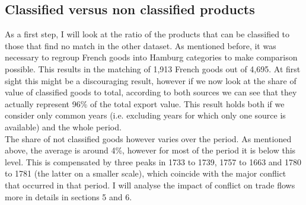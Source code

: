 \documentclass[12pt,a4paper,titlepage,english]{article}
\begin{document}
\subsection{Classified versus non classified products}
As a first step, I will look at the ratio of the products that can be classified to those that find no match in the other dataset. As mentioned before, it was necessary to regroup French goods into Hamburg categories to make comparison possible. This results in the matching of 1,913 French goods out of 4,695. At first sight this might be a discouraging result, however if we now look at the share of value of classified goods to total, according to both sources we can see that they actually represent 96\% of the total export value. This result holds both if we consider only common years (i.e. excluding years for which only one source is available) and the whole period. \\
The share of not classified goods however varies over the period. As mentioned above, the average is around 4\%, however for most of the period it is below this level. This is compensated by three peaks in 1733 to 1739, 1757 to 1663 and 1780 to 1781 (the latter on a smaller scale), which coincide with the major conflict that occurred in that period. I will analyse the impact of conflict on trade flows more in details in sections 5 and 6.
\end{document}
